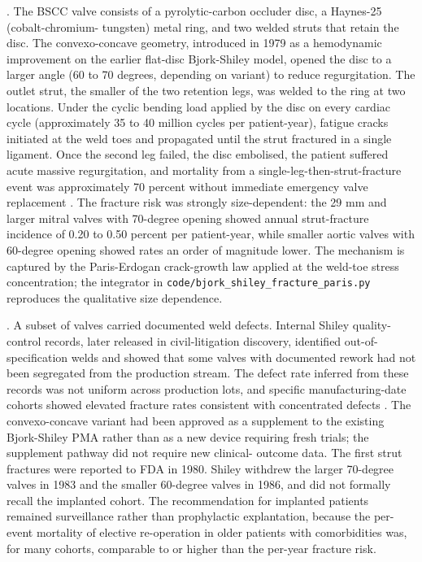 . The BSCC valve consists of a
pyrolytic-carbon occluder disc, a Haynes-25 (cobalt-chromium-
tungsten) metal ring, and two welded struts that retain the disc.
The convexo-concave geometry, introduced in 1979 as a hemodynamic
improvement on the earlier flat-disc Bjork-Shiley model, opened the
disc to a larger angle (60 to 70 degrees, depending on variant) to
reduce regurgitation. The outlet strut, the smaller of the two
retention legs, was welded to the ring at two locations. Under
the cyclic bending load applied by the disc on every cardiac
cycle (approximately 35 to 40 million cycles per patient-year),
fatigue cracks initiated at the weld toes and propagated until
the strut fractured in a single ligament. Once the second leg
failed, the disc embolised, the patient suffered acute massive
regurgitation, and mortality from a single-leg-then-strut-fracture
event was approximately 70 percent without immediate emergency
valve replacement \cite{paper:v6c12-blot-bjork-shiley-2005,
paper:v6c12-vanderlugt-strut-fracture-1993}. The fracture risk was
strongly size-dependent: the 29 mm and larger mitral valves with
70-degree opening showed annual strut-fracture incidence of 0.20
to 0.50 percent per patient-year, while smaller aortic valves
with 60-degree opening showed rates an order of magnitude lower.
The mechanism is captured by the Paris-Erdogan crack-growth law
applied at the weld-toe stress concentration; the integrator in
\texttt{code/bjork\_shiley\_fracture\_paris.py} reproduces the
qualitative size dependence.

. A subset of valves carried
documented weld defects. Internal Shiley quality-control records,
later released in civil-litigation discovery, identified
out-of-specification welds and showed that some valves with
documented rework had not been segregated from the production
stream. The defect rate inferred from these records was not
uniform across production lots, and specific manufacturing-date
cohorts showed elevated fracture rates consistent with concentrated
defects \cite{web:v6c12-doj-shiley-1994-settlement}. The
convexo-concave variant had been approved as a supplement to the
existing Bjork-Shiley PMA rather than as a new device requiring
fresh trials; the supplement pathway did not require new clinical-
outcome data. The first strut fractures were reported to FDA in
1980. Shiley withdrew the larger 70-degree valves in 1983 and the
smaller 60-degree valves in 1986, and did not formally recall the
implanted cohort. The recommendation for implanted patients
remained surveillance rather than prophylactic explantation,
because the per-event mortality of elective re-operation in older
patients with comorbidities was, for many cohorts, comparable to
or higher than the per-year fracture risk.


